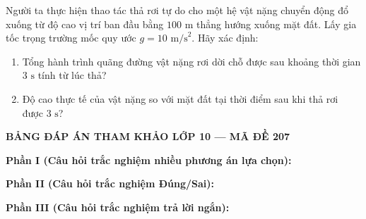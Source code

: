 	\begin{ex}%
		Người ta thực hiện thao tác thả rơi tự do cho một hệ vật nặng chuyển động đổ xuống từ độ cao vị trí ban đầu bằng $100\text{ m}$ thẳng hướng xuống mặt đất. Lấy gia tốc trọng trường mốc quy ước $g=10\text{ m/s}^2$. Hãy xác định:
		\begin{enumerate}
			\item[a, ] Tổng hành trình quãng đường vật nặng rơi dời chỗ được sau khoảng thời gian $3\text{ s}$ tính từ lúc thả?
			\item[b, ] Độ cao thực tế của vật nặng so với mặt đất tại thời điểm sau khi thả rơi được $3\text{ s}$?
		\end{enumerate}
	\end{ex}
	
	
	\newpage
	\begin{center} \textbf{BẢNG ĐÁP ÁN THAM KHẢO LỚP 10 --- MÃ ĐỀ 207} \end{center}
	
	\noindent \textbf{Phần I (Câu hỏi trắc nghiệm nhiều phương án lựa chọn):}  
	
	\noindent \textbf{Phần II (Câu hỏi trắc nghiệm Đúng/Sai):}
	
	\noindent \textbf{Phần III (Câu hỏi trắc nghiệm trả lời ngắn):}
	
	\label{B\thedeso}
	